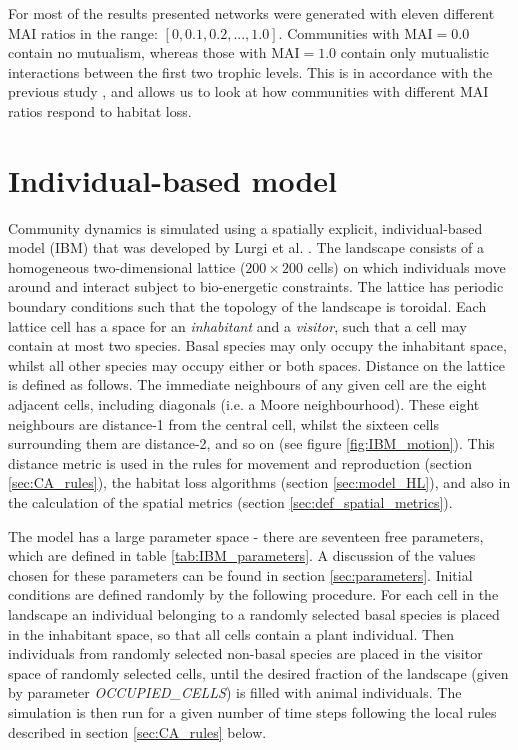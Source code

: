 For most of the results presented networks were generated with eleven different MAI ratios in the range: $[0,0.1,0.2,...,1.0]$. Communities with MAI$=0.0$ contain no mutualism, whereas those with MAI$=1.0$ contain only mutualistic interactions between the first two trophic levels. This is in accordance with the previous study \cite{lurgi2015effects}, and allows us to look at how communities with different MAI ratios respond to habitat loss. 


\section{Individual-based model}
\label{sec:the_model}


Community dynamics is simulated using a spatially explicit, individual-based model (IBM) that was developed by Lurgi et al. \cite{lurgi2015effects}. The landscape consists of a homogeneous two-dimensional lattice ($200 \times 200$ cells) on which individuals move around and interact subject to bio-energetic constraints. The lattice has periodic boundary conditions such that the topology of the landscape is toroidal. Each lattice cell has a space for an \emph{inhabitant} and a \emph{visitor}, such that a cell may contain at most two species. Basal species may only occupy the inhabitant space, whilst all other species may occupy either or both spaces. Distance on the lattice is defined as follows. The immediate neighbours of any given cell are the eight adjacent cells, including diagonals (i.e. a Moore neighbourhood). These eight neighbours are distance-1 from the central cell, whilst the sixteen cells surrounding them are distance-2, and so on (see figure \ref{fig:IBM_motion}). This distance metric is used in the rules for movement and reproduction (section \ref{sec:CA_rules}), the habitat loss algorithms (section \ref{sec:model_HL}), and also in the calculation of the spatial metrics (section \ref{sec:def_spatial_metrics}).




The model has a large parameter space - there are seventeen free parameters, which are defined in table \ref{tab:IBM_parameters}. A discussion of the values chosen for these parameters can be found in section \ref{sec:parameters}. Initial conditions are defined randomly by the following procedure. For each cell in the landscape an individual belonging to a randomly selected basal species is placed in the inhabitant space, so that all cells contain a plant individual. Then individuals from randomly selected non-basal species are placed in the visitor space of randomly selected cells, until the desired fraction of the landscape (given by parameter \emph{OCCUPIED\_CELLS}) is filled with animal individuals. The simulation is then run for a given number of time steps following the local rules described in section \ref{sec:CA_rules} below.

